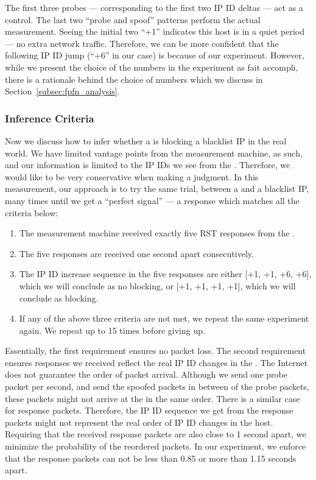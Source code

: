 The first three probes --- corresponding to the first two IP ID deltas --- act as a
control. The last two ``probe and spoof'' patterns perform the actual measurement.
Seeing the initial two ``+1'' indicates this host is in a quiet period --- no
extra network traffic. Therefore, we can be more confident that the following
IP ID jump (``+6'' in our case) is because of our experiment. However,
while we present the choice of the numbers in the experiment as fait accompli,
there is a rationale behind the choice of numbers which we discuss in Section~\ref{subsec:fpfn_analysis}.

\subsubsection{Inference Criteria}
Now we discuss how to infer whether a {} is blocking a blacklist IP
in the real world. We have limited vantage points from the measurement machine, as
such, and our information is limited to the IP IDs we see from the {}.
Therefore, we would like to be very conservative when making a judgment. In this
measurement, our approach is to try the same trial, between a {} and a
blacklist IP, many times until we get a ``perfect signal'' --- a response
which matches all the criteria below:

\begin{enumerate}
    \item The measurement machine received exactly five RST responses from the {}.
    \item The five responses are received one second apart consecutively.
    \item The IP ID increase sequence in the five responses are either [+1, +1, +6, +6],
    which we will conclude as no blocking, or [+1, +1, +1, +1], which we will
    conclude as blocking.
    \item If any of the above three criteria are not met, we repeat the same experiment
    again. We repeat up to 15 times before giving up.
\end{enumerate}

Essentially, the first requirement ensures no packet loss. The second
requirement ensures responses we received reflect the real IP ID changes in
the {}. The Internet does not guarantee the order of packet arrival.
Although we send one probe packet per second, and send the spoofed
packets in between of the probe packets, these packets might not arrive at
the {} in the same order. There is a similar case for response packets.
Therefore, the IP ID sequence we get from the response packets
might not represent the real order of IP ID changes in the host. Requiring
that
the received response packets are also close to 1 second apart, we minimize
the probability of the reordered packets. In our experiment, we enforce that
the response packets can not be less than 0.85 or more than 1.15 seconds
apart.

